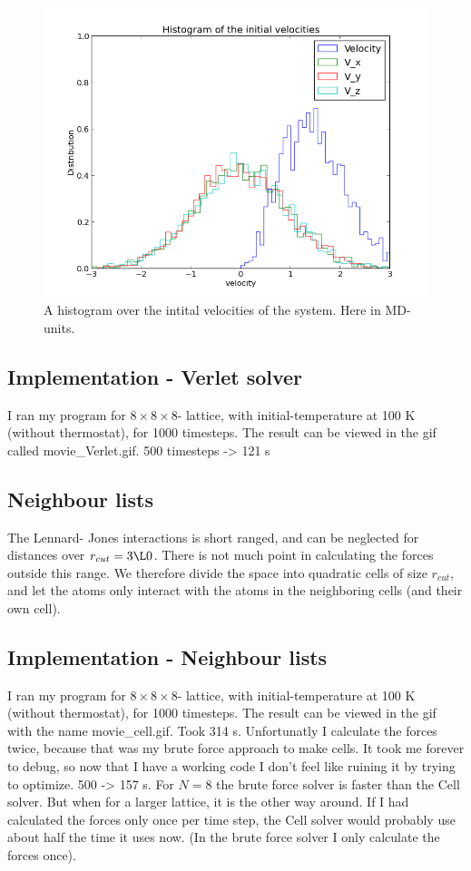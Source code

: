 \begin{figure}[H]
 \centering
 \includegraphics[width=12 cm]{./figures/initial_velo.png}
 \caption{A histogram over the intital velocities of the system. Here in MD-units.}
 \label{initial_velo}
\end{figure}
\subsection{Implementation - Verlet solver}
I ran my program for $8\times 8 \times 8$- lattice, with initial-temperature at 100 K (without thermostat), for 1000 timesteps. The result can be viewed in the gif called movie\_Verlet.gif. 500 timesteps -> 121 s
\subsection{Neighbour lists}
The Lennard- Jones interactions is short ranged, and can be neglected for distances over $r_{cut} = 3\L0$. There is not much point in calculating the forces outside this range. We therefore divide the space into quadratic cells of size $r_{cut}$, and let the 
atoms only interact with the atoms in the neighboring cells (and their own cell).
\subsection{Implementation - Neighbour lists}
I ran my program for $8\times 8 \times 8$- lattice, with initial-temperature at 100 K (without thermostat), for 1000 timesteps. The result can be viewed in the gif with the name movie\_cell.gif. Took 314 s. Unfortunatly I calculate
the forces twice, because that was my brute force approach to make cells. It took me forever to debug, so now that I have a working code I don't feel like ruining it by trying to optimize. 500 -> 157 s. For $N=8$ the brute force solver is faster than
the Cell solver. But when for a larger lattice, it is the other way around. If I had calculated the forces only once per time step, the Cell solver would probably use about half the time it uses now. (In the brute force solver I only calculate the forces once). 

